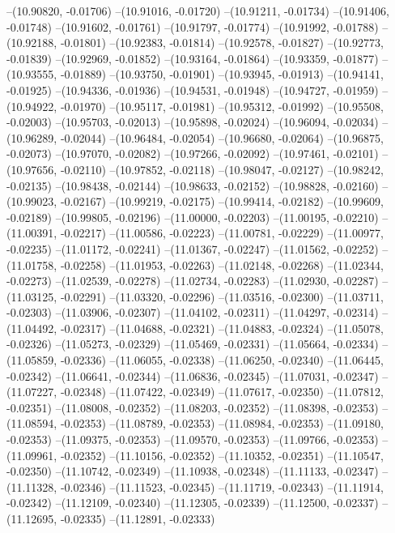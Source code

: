 --(10.90820, -0.01706)
--(10.91016, -0.01720)
--(10.91211, -0.01734)
--(10.91406, -0.01748)
--(10.91602, -0.01761)
--(10.91797, -0.01774)
--(10.91992, -0.01788)
--(10.92188, -0.01801)
--(10.92383, -0.01814)
--(10.92578, -0.01827)
--(10.92773, -0.01839)
--(10.92969, -0.01852)
--(10.93164, -0.01864)
--(10.93359, -0.01877)
--(10.93555, -0.01889)
--(10.93750, -0.01901)
--(10.93945, -0.01913)
--(10.94141, -0.01925)
--(10.94336, -0.01936)
--(10.94531, -0.01948)
--(10.94727, -0.01959)
--(10.94922, -0.01970)
--(10.95117, -0.01981)
--(10.95312, -0.01992)
--(10.95508, -0.02003)
--(10.95703, -0.02013)
--(10.95898, -0.02024)
--(10.96094, -0.02034)
--(10.96289, -0.02044)
--(10.96484, -0.02054)
--(10.96680, -0.02064)
--(10.96875, -0.02073)
--(10.97070, -0.02082)
--(10.97266, -0.02092)
--(10.97461, -0.02101)
--(10.97656, -0.02110)
--(10.97852, -0.02118)
--(10.98047, -0.02127)
--(10.98242, -0.02135)
--(10.98438, -0.02144)
--(10.98633, -0.02152)
--(10.98828, -0.02160)
--(10.99023, -0.02167)
--(10.99219, -0.02175)
--(10.99414, -0.02182)
--(10.99609, -0.02189)
--(10.99805, -0.02196)
--(11.00000, -0.02203)
--(11.00195, -0.02210)
--(11.00391, -0.02217)
--(11.00586, -0.02223)
--(11.00781, -0.02229)
--(11.00977, -0.02235)
--(11.01172, -0.02241)
--(11.01367, -0.02247)
--(11.01562, -0.02252)
--(11.01758, -0.02258)
--(11.01953, -0.02263)
--(11.02148, -0.02268)
--(11.02344, -0.02273)
--(11.02539, -0.02278)
--(11.02734, -0.02283)
--(11.02930, -0.02287)
--(11.03125, -0.02291)
--(11.03320, -0.02296)
--(11.03516, -0.02300)
--(11.03711, -0.02303)
--(11.03906, -0.02307)
--(11.04102, -0.02311)
--(11.04297, -0.02314)
--(11.04492, -0.02317)
--(11.04688, -0.02321)
--(11.04883, -0.02324)
--(11.05078, -0.02326)
--(11.05273, -0.02329)
--(11.05469, -0.02331)
--(11.05664, -0.02334)
--(11.05859, -0.02336)
--(11.06055, -0.02338)
--(11.06250, -0.02340)
--(11.06445, -0.02342)
--(11.06641, -0.02344)
--(11.06836, -0.02345)
--(11.07031, -0.02347)
--(11.07227, -0.02348)
--(11.07422, -0.02349)
--(11.07617, -0.02350)
--(11.07812, -0.02351)
--(11.08008, -0.02352)
--(11.08203, -0.02352)
--(11.08398, -0.02353)
--(11.08594, -0.02353)
--(11.08789, -0.02353)
--(11.08984, -0.02353)
--(11.09180, -0.02353)
--(11.09375, -0.02353)
--(11.09570, -0.02353)
--(11.09766, -0.02353)
--(11.09961, -0.02352)
--(11.10156, -0.02352)
--(11.10352, -0.02351)
--(11.10547, -0.02350)
--(11.10742, -0.02349)
--(11.10938, -0.02348)
--(11.11133, -0.02347)
--(11.11328, -0.02346)
--(11.11523, -0.02345)
--(11.11719, -0.02343)
--(11.11914, -0.02342)
--(11.12109, -0.02340)
--(11.12305, -0.02339)
--(11.12500, -0.02337)
--(11.12695, -0.02335)
--(11.12891, -0.02333)
